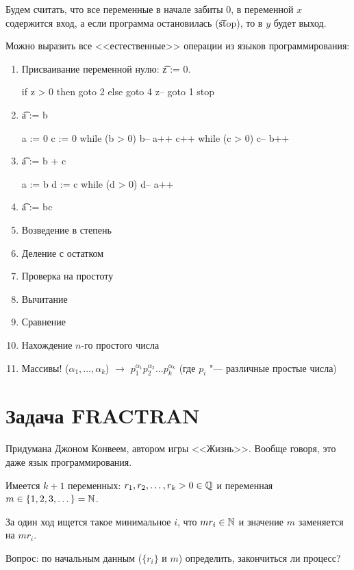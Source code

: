 Будем считать, что все переменные в начале забиты 0, в переменной $x$ содержится вход, а если программа остановилась (\t{stop}), то
в $y$ будет выход.

\begin{exmp}
	Можно выразить все <<естественные>> операции из языков программирования:
	\begin{enumerate}
		\item Присваивание переменной нулю: \t{z := 0}.
		\begin{cppcode}
if z > 0 then goto 2 else goto 4
z--
goto 1
stop    \end{cppcode}
		\item \t{a := b}
		\begin{cppcode}
a := 0
c := 0
while (b > 0)
	b--
	a++
	c++
while (c > 0)
	c--
	b++ \end{cppcode}
	\item \t{a := b + c}
	\begin{cppcode}
a := b
d := c
while (d > 0)
	d--
	a++ 
	\end{cppcode}
	\item \t{a := bc}
	\item Возведение в степень
	\item Деление с остатком
	\item Проверка на простоту
	\item Вычитание
	\item Сравнение
	\item Нахождение $n$-го простого числа
	\item Массивы! ($\alpha_1, \dots, \alpha_k$) $\rightarrow$ $p_1^{\alpha_1}p_2^{\alpha_2}\dots p_k^{\alpha_k}$ (где $p_i$ "--- различные простые числа)
	\end{enumerate}
\end{exmp} 


\section{Задача FRACTRAN}
Придумана Джоном Конвеем, автором игры <<Жизнь>>.
Вообще говоря, это даже язык программирования.

Имеется $k+1$ переменных: $r_1, r_2, \dots, r_k > 0 \in \mathbb{Q}$ и переменная $m \in \{1, 2, 3, \dots\} = \mathbb{N}$.

За один ход ищется такое минимальное $i$, что $mr_i \in \mathbb{N}$ и значение $m$ заменяется на $mr_i$.

Вопрос: по начальным данным ($\{r_i\}$ и $m$) определить, закончиться ли процесс?

